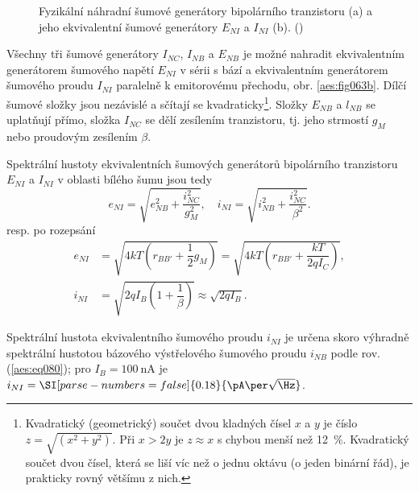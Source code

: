         \begin{figure}[ht!]  %
          \centering
          \caption{ Fyzikální náhradní šumové generátory bipolárního tranzistoru (a) a jeho
                    ekvivalentní šumové generátory \(E_{NI}\) a \(I_{NI}\) (b).
                    (\cite[s.~51]{Dostal})}
          \label{aes:fig063}
        \end{figure} 

        Všechny tři šumové generátory \(I_{NC}\), \(I_{NB}\) a \(E_{NB}\) je možné nahradit
        ekvivalentním generátorem šumového napětí \(E_{NI}\) v sérii s bází a ekvivalentním
        generátorem šumového proudu \(I_{NI}\) paralelně k emitorovému přechodu, obr.
        \ref{aes:fig063b}. Dílčí šumové složky jsou nezávislé a sčítají se
        kvadraticky\footnote{Kvadratický (geometrický) součet dvou kladných čísel \(x\) a \(y\) je
        číslo \(z = \sqrt{(x^2 + y^2)}\). Při \(x > 2y\) je \(z \approx x\) s chybou menší než
        \qty{12}{\percent}. Kvadratický součet dvou čísel, která se liší víc než o jednu oktávu (o
        jeden binární řád), je prakticky rovný většímu z nich.}. Složky \(E_{NB}\) a \(l_{NB}\) se
        uplatňují přímo, složka \(I_{NC}\) se dělí zesílením tranzistoru, tj. jeho strmostí \(g_M\)
        nebo proudovým zesílením \(\beta\).

        Spektrální hustoty ekvivalentních šumových generátorů bipolárního tranzistoru \(E_{NI}\) a
        \(I_{NI}\) v oblasti bílého šumu jsou tedy
        \begin{equation}\label{aes:eq082}
          e_{NI} = \sqrt{e_{NB}^2 + \dfrac{i_{NC}^2}{g_M^2}}, \quad
          i_{NI} = \sqrt{i_{NB}^2 + \dfrac{i_{NC}^2}{\beta^2}}.
        \end{equation} 
        resp. po rozepsání
        \begin{align}
          e_{NI} &= \sqrt{4kT\left(r_{BB'} + \dfrac{1}{2}g_M\right)} 
                  = \sqrt{4kT\left(r_{BB'} + \dfrac{kT}{2qI_C}\right)},  \label{aes:eq083a} \\
          i_{NI} &= \sqrt{2qI_B\left(1 + \dfrac{1}{\beta}\right)} 
                    \approx\sqrt{2qI_B}.                                 \label{aes:eq083b}  
        \end{align}

        Spektrální hustota ekvivalentního šumového proudu \(i_{NI}\) je určena skoro výhradně
        spektrální hustotou bázového výstřelového šumového proudu \(i_{NB}\) podle rov.
        (\ref{aes:eq080}); pro \(I_B = \qty{100}{\nA}\) je \(i_{NI} = \SI[parse-numbers =
        false]{0.18}{\pA\per\sqrt{\Hz}}\). 

